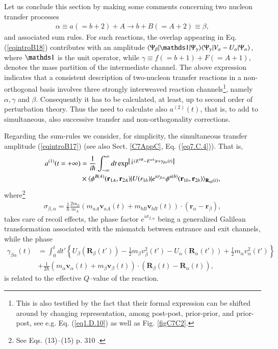 \begin{subappendices}
 Let us conclude this section by making some comments concerning two nucleon transfer processes
 \begin{align}
 \alpha\equiv a (=b+2)+A\rightarrow b+B(=A+2)\equiv\beta,
 \end{align}
 and associated sum rules.
 For such reactions, the overlap appearing in Eq. (\ref{eqintroB18}) 
 contributes with an amplitude $\braket{\Psi_\beta|\idop|\Psi_\gamma}\braket{\Psi_\gamma|V_\alpha-U_\alpha|\Psi_\alpha}$, where $\idop$ is the unit operator, while $\gamma\equiv f(=b+1)+F(=A+1)$, denotes the mass partition of the intermediate channel. 
 The above expression indicates that a consistent description of two-nucleon transfer reactions in a non-orthogonal basis involves  three strongly interweaved  reaction channels\footnote{This is also testified by the fact that their formal expression can be shifted around by changing representation, among  post-post, prior-prior, and prior-post, see e.g. Eq. (\ref{eq1.D.10}) as well as Fig. \ref{figC7C2}.}, namely $\alpha,\gamma$ and $\beta$. Consequently it has to be calculated, at least, up to second order of perturbation theory. Thus the need to calculate also $a^{(2)}(t)$,  that is, to add to simultaneous, also successive transfer and non-orthogonality corrections.
 
 Regarding the sum-rules  we consider,  for simplicity, the simultaneous transfer amplitude (\ref{eqintroB17}) (see also Sect. \ref{C7AppC}, Eq. (\ref{eq7.C.4})). That is,
 \begin{align}\label{eqintroB19}
 \nonumber a^{(1)}(t=+\infty)&=\frac{1}{i\hbar}\int^{\infty}_{-\infty}dt\exp^{\left[\frac{i}{\hbar}(E^{bB}-E^{aA})t+\gamma_{\beta\alpha}(t)\right]}\\
 &\times\langle {\phi^{B(A)}(\mathbf r_{1A},\mathbf r_{2A})|U(r_{1b})|e^{i\sigma_{\beta,\alpha}}\phi^{a(b)}(\mathbf r_{1b},\mathbf r_{2b})} \rangle_{\mathbf R_{\alpha\beta}(t)},
 \end{align}
 where\footnote{See Eqs. (13)--(15) p. 310 \cite{Broglia:04a}.}
 \begin{align}
 \sigma_{\beta,\alpha}=\frac{1}{\hbar}\frac{2m_n}{m_A}(m_{aA}\mathbf v_{aA}(t)+m_{bB}\mathbf v_{bB}(t))\cdot(\mathbf r_\alpha-\mathbf r_\beta),
 \end{align}
 takes care of recoil effects, the phase factor $e^{i\sigma_{\beta,\alpha}}$ being a generalized Galilean transformation associated with the mismatch between entrance and exit channels,  while the phase
 \begin{align}\label{eqintroB21}
 \nonumber\gamma_{\beta\alpha}(t)&=\int^t_0 dt'\left\{U_\beta(\mathbf R_{\beta}(t'))-\frac{1}{2}m_\beta v_\beta^2(t')-U_\alpha(\mathbf R_\alpha(t'))+\frac{1}{2}m_\alpha v_\alpha^2(t')\right\}\\
 &+\frac{1}{2\hbar}\left(m_\alpha \mathbf v_\alpha(t)+m_\beta \mathbf v_\beta(t) \right)\cdot(\mathbf R_\beta(t)-\mathbf R_\alpha(t)),
 \end{align}
 is related to the effective $Q$--value of the reaction.
 

\end{subappendices}
